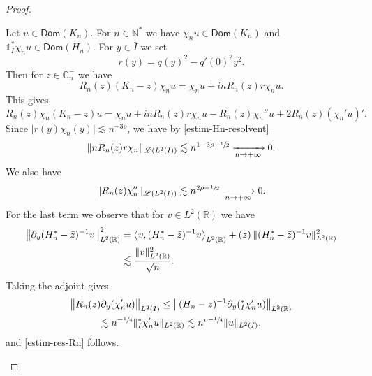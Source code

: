 \documentclass[11pt]{article}
\numberwithin{equation}{section}
\let\mathcal\mathscr
\theoremstyle{plain}
\theoremstyle{definition}
\newcommand {\limt}[2]{\xrightarrow[#1 \to #2]{}}
\newcommand{\abs}[1]{\vert #1\vert}
\newcommand{\nr}[1]{\Vert #1\Vert}
\newcommand{\bnr}[1]{\bigl\Vert #1\bigr\Vert}
\newcommand{\binnp}[2]{\bigl\langle #1 , #2 \bigr\rangle}
\newcommand{\inv}{^{-1}}
\newcommand{\1}{\mathds 1}
\let\Re\relax
\DeclareMathOperator{\Re}{\mathsf{Re}\mkern2mu}
\newcommand{\Dom}{\mathsf{Dom}}
\newcommand{\R}{\mathbb{R}}
\def\C{\mathbb{C}}
\newcommand{\N}{\mathbb{N}}
\let\h\chi
\newcommand{\Lc}{{\mathcal L}}
\begin{document}
\begin{proof}
\begin{itemize}
Let $u \in \Dom(K_n)$. For $n \in \N^*$ we have $\chi_n u \in \Dom(K_n)$ and $\1_I^* \chi_n u \in \Dom(H_n)$. For $y \in \bar I$ we set
\[
r(y) = q(y)^2 - q'(0)^2 y^2.
\]
Then for $z \in \C_n^-$ we have
\[
R_n(z) (K_n-z) \chi_n u = \chi_n u + i n R_n(z) r \chi_n u.
\]
This gives
\begin{equation} \label{eq-K-Rn}
R_n(z) \chi_n (K_n-z) u = \chi_n u + i n R_n(z) r \chi_n u - R_n(z) \chi_n'' u + 2 R_n(z) (\chi_n' u)'.
\end{equation}
Since $\abs{r(y) \h_n(y)} \lesssim n^{-3\rho}$, we have by \eqref{estim-Hn-resolvent}
\begin{equation*}
\nr{n R_n(z) r \h_n}_{\Lc(L^2(I))} \lesssim n^{1 - 3\rho - \sfrac 12} \limt n {+\infty} 0.
\end{equation*}
We also have
\[
\nr{R_n(z) \chi_n''}_{\Lc(L^2(I))} \lesssim n^{2\rho - \sfrac 12} \limt n {+\infty} 0.
\]
For the last term we observe that for $v \in L^2(\R)$ we have
\begin{align*}
\bnr{\partial_y (H_n^*-\bar z)\inv v}_{L^2(\R)}^2
& = \Re \binnp{v}{(H_n^*-\bar z)\inv v}_{L^2(\R)} + \Re(z)\, \nr{(H_n^*-\bar z)\inv v}_{L^2(\R)}^2\\
& \lesssim \frac {\nr{v}_{L^2(\R)}^2}{\sqrt n}.
\end{align*}
Taking the adjoint gives
\begin{multline*}
\bnr{R_n(z) \partial_y (\chi_n' u)}_{L^2(I)} \leq \bnr{(H_n-z)\inv \partial_y (\1_I^* \h_n' u)}_{L^2(\R)}\\
\lesssim n^{-\sfrac 14} \nr{\1_I^* \chi_n'u}_{L^2(\R)} \lesssim n^{\rho-\sfrac 14} \nr{u}_{L^2(I)},
\end{multline*}
and \eqref{estim-res-Rn} follows.


\end{itemize}
\end{proof}
\end{document}
